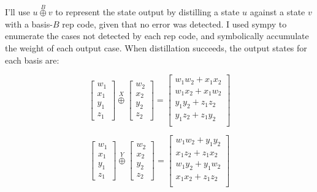 \documentclass[onecolumn,unpublished,a4paper]{quantumarticle}
\theoremstyle{definition}
\theoremstyle{definition}
\theoremstyle{definition}
\begin{document}
I'll use $u \stackrel{B}{\oplus} v$ to represent the state output by distilling a state $u$ against a state $v$ with a basis-$B$ rep code, given that no error was detected.
I used sympy to enumerate the cases not detected by each rep code, and symbolically accumulate the weight of each output case.
When distillation succeeds, the output states for each basis are:

\begin{equation}
\begin{bmatrix}w_1\\x_1\\y_1\\z_1\end{bmatrix}
\stackrel{X}{\oplus}
\begin{bmatrix}w_2\\x_2\\y_2\\z_2\end{bmatrix}
=\begin{bmatrix}
w_1w_2+x_1x_2\\
w_1x_2+x_1w_2\\
y_1y_2+z_1z_2\\
y_1z_2+z_1y_2\\
\end{bmatrix}
\end{equation}

\begin{equation}
\begin{bmatrix}w_1\\x_1\\y_1\\z_1\end{bmatrix}
\stackrel{Y}{\oplus}
\begin{bmatrix}w_2\\x_2\\y_2\\z_2\end{bmatrix}
=\begin{bmatrix}
w_1w_2+y_1y_2\\
x_1z_2+z_1x_2\\
w_1y_2+y_1w_2\\
x_1x_2+z_1z_2\\
\end{bmatrix}
\end{equation}
\end{document}
